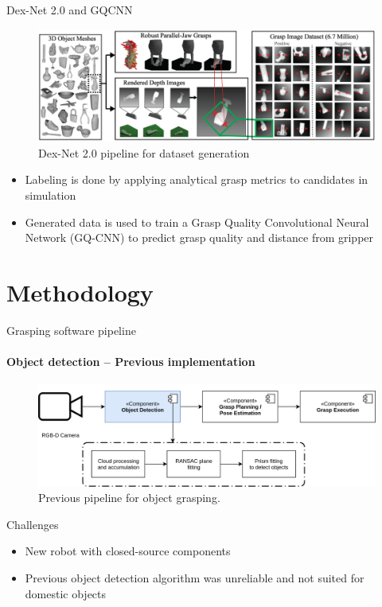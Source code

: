 \documentclass{beamer}
\begin{document}
\begin{frame}{Dex-Net 2.0 and GQCNN}
    \begin{figure}[b]
        \centering
        \includegraphics[width=0.9\linewidth]{mahler_et_al-2017-fig3}
        \caption{Dex-Net 2.0 pipeline for dataset generation \cite{mahler2017}}
    \end{figure}
    \begin{itemize}
        \item Labeling is done by applying analytical grasp metrics to candidates in simulation
        \item Generated data is used to train a Grasp Quality Convolutional Neural Network (GQ-CNN) to predict grasp
            quality and distance from gripper
    \end{itemize}
\end{frame}

\section{Methodology}
\begin{frame}{Grasping software pipeline}
\framesubtitle{Object detection -- Previous implementation}
    \begin{figure}[b]
        \centering
        \includegraphics[width=0.8\linewidth]{grasp_pipeline_old_perception}
        \caption{Previous pipeline for object grasping.}
    \end{figure}
    \begin{exampleblock}{Challenges}
        \begin{itemize}
            \item New robot with closed-source components
            \item Previous object detection algorithm was unreliable and not suited for domestic objects
        \end{itemize}
    \end{exampleblock}
\end{frame}
\end{document}
